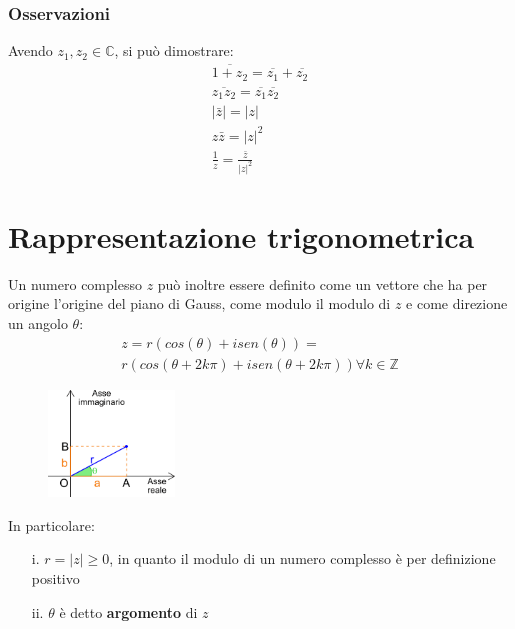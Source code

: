 \subsubsection{Osservazioni}
Avendo $z_1,z_2 \in \mathbb{C}$, si può dimostrare:\\
\begin{equation}
\begin{gathered}
\overline{1+z_2} = \overline{z_1}+\overline{z_2}\\
\overline{z_1z_2} = \overline{z_1}\overline{z_2}\\
|\bar{z}| = |z|\\
z\bar{z}=|z|^2\\
\frac{1}{z} = \frac{\bar{z}}{|z|^2}
\end{gathered}
\end{equation}

\section{Rappresentazione trigonometrica}
Un numero complesso $z$ può inoltre essere definito come un vettore che ha per origine l'origine del piano di Gauss, come modulo il modulo di $z$ e come direzione un angolo $\theta$:\\
\begin{equation}
\begin{gathered}
z=r(cos(\theta)+isen(\theta)) =\\
r(cos(\theta+2k\pi)+isen(\theta+2k\pi)) \forall k \in \mathbb{Z}
\end{gathered}
\end{equation}

\begin{figure}[htbp]
	\centering
	\includegraphics[width=0.3\textwidth]{Pictures/piano_gauss_trigonometria.png}
\end{figure}

In particolare:
\begin{enumerate}
	\item [i.] $r = |z| \geq 0$, in quanto il modulo di un numero complesso è per definizione positivo
	\item [ii.] $\theta$ è detto \textbf{argomento} di $z$
\end{enumerate}

